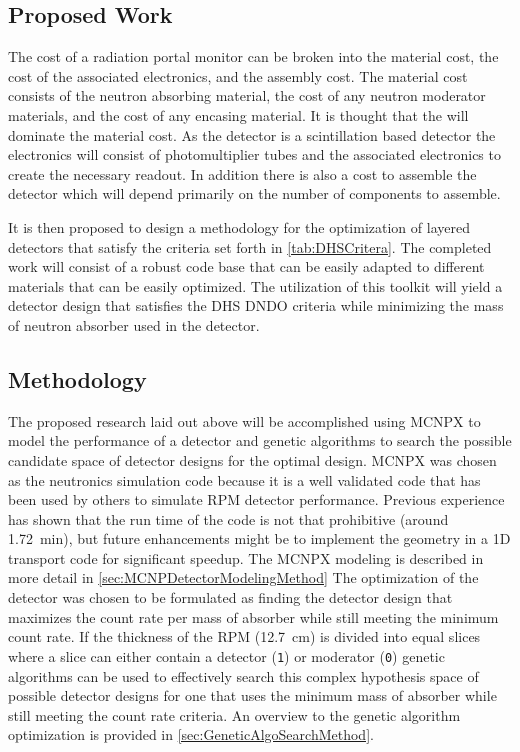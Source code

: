 \subsection{Proposed Work}
The cost of a radiation portal monitor can be broken into the material cost, the cost of the associated electronics, and the assembly cost.
The material cost consists of the neutron absorbing material, the cost of any neutron moderator materials, and the cost of any encasing material. 
It is thought that the  will dominate the material cost.
As the detector is a scintillation based detector the electronics will consist of photomultiplier tubes and the associated electronics to create the necessary readout.
In addition there is also a cost to assemble the detector which will depend primarily on the number of components to assemble.

It is then proposed to design a methodology for the optimization of layered detectors that satisfy the criteria set forth in \autoref{tab:DHSCritera}.
The completed work will consist of a robust code base that can be easily adapted to different materials that can be easily optimized.
The utilization of this toolkit will yield a detector design that satisfies the DHS DNDO criteria while minimizing the mass of neutron absorber used in the detector.

\subsection{Methodology}
The proposed research laid out above will be accomplished using MCNPX to model the performance of a detector and genetic algorithms to search the possible candidate space of detector designs for the optimal design.
MCNPX was chosen as the neutronics simulation code because it is a well validated code that has been used by others to simulate RPM detector performance.
Previous experience has shown that the run time of the code is not that prohibitive (around \SI{1.72}{\minute}), but future enhancements might be to implement the geometry in a 1D transport code for significant speedup.
The MCNPX modeling is described in more detail in \autoref{sec:MCNPDetectorModelingMethod}
The optimization of the detector was chosen to be formulated as finding the detector design that maximizes the count rate per mass of absorber while still meeting the minimum count rate.
If the thickness of the RPM (\SI{12.7}{\cm}) is divided into equal slices where a slice can either contain a detector (\verb+1+) or moderator (\verb+0+) genetic algorithms can be used to effectively search this complex hypothesis space of possible detector designs for one that uses the minimum mass of absorber while still meeting the count rate criteria.
An overview to the genetic algorithm optimization is provided in \autoref{sec:GeneticAlgoSearchMethod}.
